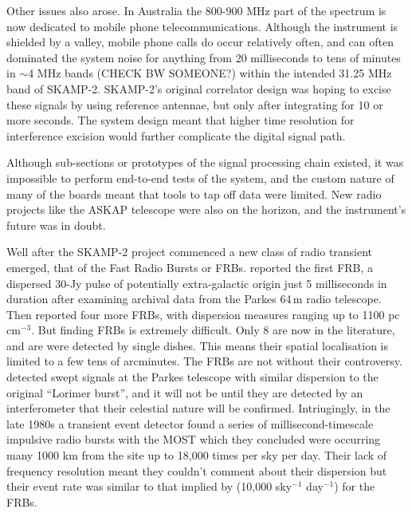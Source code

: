 Other issues also arose. In Australia the 800-900 MHz part of the spectrum is now dedicated to mobile phone telecommunications. Although the instrument is shielded by a valley, mobile phone calls do occur relatively often, and can often dominated the system noise for anything from 20 milliseconds to tens of minutes in $\sim$4 MHz bands (CHECK BW SOMEONE?) within the intended 31.25 MHz band of SKAMP-2. SKAMP-2's original correlator design was hoping to excise these signals by using reference antennae, but only after integrating for 10 or more seconds. The system design meant that higher time resolution for interference excision would further complicate the digital signal path. 

Although sub-sections or prototypes of the signal processing chain existed, it was impossible to perform end-to-end tests of the system, and the custom nature of many of the boards meant that tools to tap off data were limited.  New radio projects like the ASKAP telescope were also on the horizon, and the instrument's future was in doubt.

Well after the SKAMP-2 project commenced a new class of radio transient emerged, that of the Fast Radio Bursts or FRBs. \cite{Lorimer_2007} reported the first FRB, a dispersed 30-Jy pulse of potentially extra-galactic origin just 5 milliseconds in duration after examining archival data from the Parkes 64\,m radio telescope. Then \cite{Thornton_2013} reported four more FRBs, with dispersion measures ranging up to 1100 pc cm$^{-3}$. But finding FRBs is extremely difficult. Only 8 are now in the literature, and are were detected by single dishes. This means their spatial localisation is limited to a few tens of arcminutes. 
The FRBs are not without their controversy. \cite{Burke_Spolaor_2011} detected swept signals at the Parkes telescope with similar dispersion to the original ``Lorimer burst'', and it will not be until they are detected by an interferometer that their celestial nature will be confirmed. Intriugingly, in the late 1980s a transient event detector found a series of millisecond-timescale impulsive radio bursts with the MOST which they concluded were occurring many 1000 km from the site up to 18,000 times per sky per day\cite{Lovell_2008}. Their lack of frequency resolution meant they couldn't comment about their dispersion but their event rate was similar to that implied by \cite{Thornton_2013} (10,000 sky$^{-1}$ day$^{-1}$) for the FRBs.

